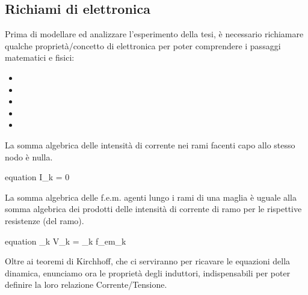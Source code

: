 \subsection{Richiami di elettronica}
Prima di modellare ed analizzare l'esperimento della tesi, è necessario richiamare qualche proprietà/concetto di elettronica per poter comprendere i passaggi matematici e fisici:
\vspace{-5mm}
\begin{itemize}[itemsep=-4mm]
	\item {}
	\item {}
	\item {}
	\item {}
	\item {}
\end{itemize}


\begin{teorema}
	La somma algebrica delle intensità di corrente nei rami facenti capo allo stesso nodo è nulla.
	\begin{empheq}[box=\mathStep]{equation} \label{eq:KirchhoffNodi}
		\sum I_k = 0
	\end{empheq}
\end{teorema}

\begin{teorema}
	La somma algebrica delle f.e.m. agenti lungo i rami di una maglia è uguale alla somma algebrica dei prodotti delle intensità di corrente di ramo per le rispettive resistenze (del ramo).
	\begin{empheq}[box=\mathStep]{equation} \label{eq:KirchhoffMaglie}
		\sum_{\forall k} V_k = \sum_{\forall k} f_{em_k}
	\end{empheq}
\end{teorema}
\vspace{-5mm}
\noindent
Oltre ai teoremi di Kirchhoff, che ci serviranno per ricavare le equazioni della dinamica, enunciamo ora le proprietà degli induttori, indispensabili per poter definire la loro relazione Corrente/Tensione.

